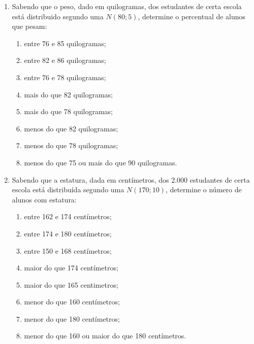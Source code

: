 \begin{enumerate}[resume]
\item Sabendo que o peso, dado em quilogramas, dos estudantes de certa escola está distribuido segundo uma $N(80 ; 5)$, determine o percentual de alunos que pesam:
	\begin{enumerate}
	\item entre 76 e 85 quilogramas;
	\item entre 82 e 86 quilogramas;
	\item entre 76 e 78 quilogramas;
	\item mais do que 82 quilogramas;
	\item mais do que 78 quilogramas;
	\item menos do que 82 quilogramas;
	\item menos do que 78 quilogramas;
	\item menos do que 75 ou mais do que 90 quilogramas.
	\end{enumerate}


\item Sabendo que a estatura, dada em centímetros, dos 2.000 estudantes de certa escola está distribuída segundo uma $N(170 ; 10)$, determine o número de alunos com estatura:
	\begin{enumerate}
	\item entre 162 e 174 centímetros;
	\item entre 174 e 180 centímetros;
	\item entre 150 e 168 centímetros;
	\item maior do que 174 centímetros;
	\item maior do que 165 centimetros;
	\item menor do que 160 centímetros;
	\item menor do que 180 centímetros;
	\item menor do que 160 ou maior do que 180 centímetros.
	\end{enumerate}


\end{enumerate}
